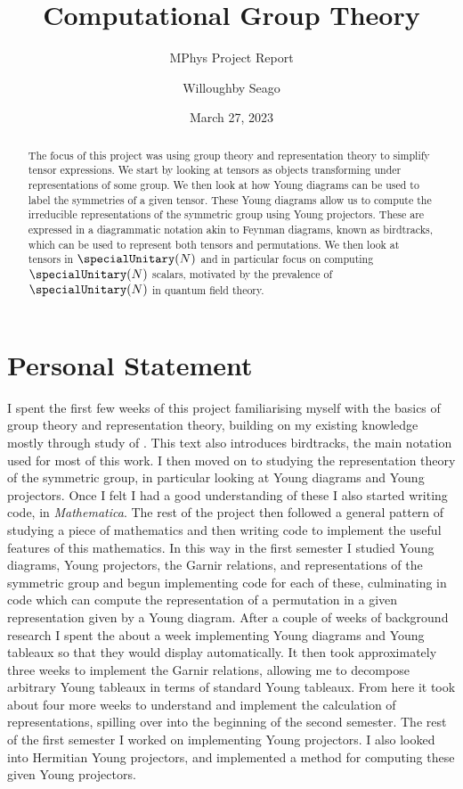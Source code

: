 \documentclass[fleqn]{NotesClass}
\title{Computational Group Theory}
\author{Willoughby Seago}
\date{March 27, 2023}
\subtitle{MPhys Project Report}
\newcommand{\Mathematica}{\textit{Mathematica}}
\begin{document}
    \frontmatter
    \titlepage
    \maketitle
    \begin{abstract}
        The focus of this project was using group theory and representation theory to simplify tensor expressions.
        We start by looking at tensors as objects transforming under representations of some group.
        We then look at how Young diagrams can be used to label the symmetries of a given tensor.
        These Young diagrams allow us to compute the irreducible representations of the symmetric group using Young projectors.
        These are expressed in a diagrammatic notation akin to Feynman diagrams, known as birdtracks, which can be used to represent both tensors and permutations.
        We then look at tensors in \(\specialUnitary(N)\) and in particular focus on computing \(\specialUnitary(N)\) scalars, motivated by the prevalence of \(\specialUnitary(N)\) in quantum field theory.
    \end{abstract}
    \tableofcontents
    \chapter{Personal Statement}
    I spent the first few weeks of this project familiarising myself with the basics of group theory and representation theory, building on my existing knowledge mostly through study of \cite{cvitanovic}.
    This text also introduces birdtracks, the main notation used for most of this work.
    I then moved on to studying the representation theory of the symmetric group, in particular looking at Young diagrams and Young projectors.
    Once I felt I had a good understanding of these I also started writing code, in \Mathematica.
    The rest of the project then followed a general pattern of studying a piece of mathematics and then writing code to implement the useful features of this mathematics.
    In this way in the first semester I studied Young diagrams, Young projectors, the Garnir relations, and representations of the symmetric group and begun implementing code for each of these, culminating in code which can compute the representation of a permutation in a given representation given by a Young diagram.
    After a couple of weeks of background research I spent the about a week implementing Young diagrams and Young tableaux so that they would display automatically.
    It then took approximately three weeks to implement the Garnir relations, allowing me to decompose arbitrary Young tableaux in terms of standard Young tableaux.
    From here it took about four more weeks to understand and implement the calculation of representations, spilling over into the beginning of the second semester.
    The rest of the first semester I worked on implementing Young projectors.
    I also looked into Hermitian Young projectors, and implemented a method for computing these given Young projectors.
    
\end{document}
